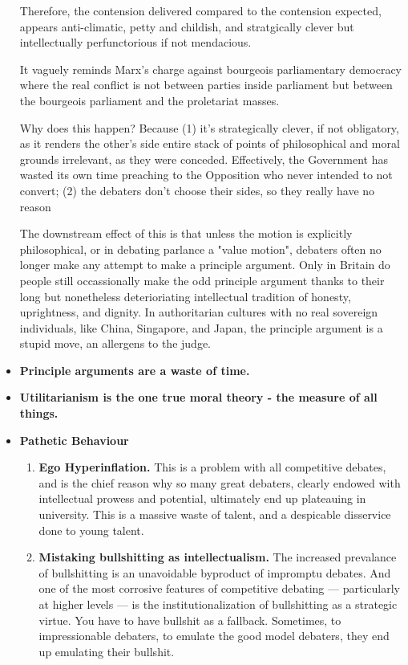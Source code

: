 \begin{itemize}
    Therefore, the contension delivered compared to the contension expected, appears anti-climatic, petty and childish, and stratgically clever but intellectually perfunctorious if not mendacious.  

    It vaguely reminds Marx's charge against bourgeois parliamentary democracy where the real conflict is not between parties inside parliament but between the bourgeois parliament and the proletariat masses.

    Why does this happen? Because (1) it's strategically clever, if not obligatory, as it renders the other's side entire stack of points of philosophical and moral grounds irrelevant, as they were conceded. Effectively, the Government has wasted its own time preaching to the Opposition who never intended to not convert; (2) the debaters don't choose their sides, so they really have no reason 

    The downstream effect of this is that unless the motion is explicitly philosophical, or in debating parlance a "value motion", debaters often no longer make any attempt to make a principle argument. Only in Britain do people still occassionally make the odd principle argument thanks to their long but nonetheless deterioriating intellectual tradition of honesty, uprightness, and dignity. In authoritarian cultures with no real sovereign individuals, like China, Singapore, and Japan, the principle argument is a stupid move, an allergens to the judge.

    \item \textbf{Principle arguments are a waste of time.}
    \item \textbf{Utilitarianism is the one true moral theory - the measure of all things.}
    \item \textbf{Pathetic Behaviour } 
        \begin{enumerate}
            \item \textbf{Ego Hyperinflation.} This is a problem with all competitive debates, and is the chief reason why so many great debaters, clearly endowed with intellectual prowess and potential, ultimately end up plateauing in university. This is a massive waste of talent, and a despicable disservice done to young talent. 
            \item \textbf{Mistaking bullshitting as intellectualism.} The increased prevalance of bullshitting is an unavoidable byproduct of impromptu debates. And one of the most corrosive features of competitive debating — particularly at higher levels — is the institutionalization of bullshitting as a strategic virtue. You have to have bullshit as a fallback. Sometimes, to impressionable debaters, to emulate the good model debaters, they end up emulating their bullshit.
            

\end{enumerate}
\end{itemize}
